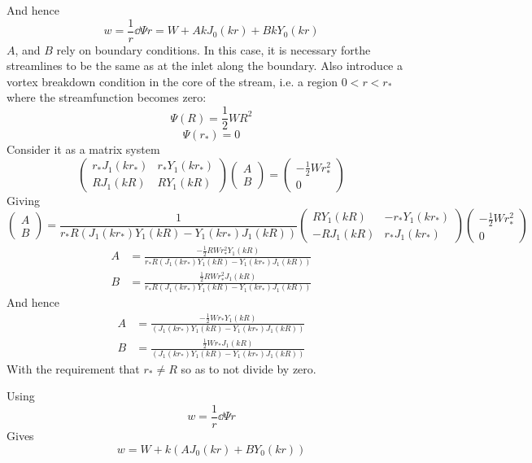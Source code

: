 \documentclass{X:/Documents/Coding/Latex/myreport}
\begin{document}
And hence
\[w = \frac1r \dd\Psi r = W + Ak J_0(kr) + Bk Y_0(kr)\]
$A$, and $B$ rely on boundary conditions. In this case, it is necessary forthe streamlines to be the same as at the inlet along the boundary. Also introduce a vortex breakdown condition in the core of the stream, i.e. a region $0<r<r_*$ where the streamfunction becomes zero:
\[\Psi(R) = \frac12 WR^2\]
\[\Psi(r_*) = 0 \]
Consider it as a matrix system
\[
\begin{pmatrix}
r_*J_1(kr_*) & r_*Y_1(kr_*)\\
RJ_1(kR) & RY_1(kR)
\end{pmatrix}\begin{pmatrix}
A\\B
\end{pmatrix} = 
\begin{pmatrix}
-\frac12 Wr_*^2\\0
\end{pmatrix}
\]
Giving
\[
\begin{pmatrix}
A\\B
\end{pmatrix} = 
\frac{1}{r_* R\left(J_1(kr_*)Y_1(kR) - Y_1(kr_*)J_1(kR)\right)}
\begin{pmatrix}
RY_1(kR) & -r_*Y_1(kr_*)\\
-RJ_1(kR) & r_*J_1(kr_*)
\end{pmatrix}
\begin{pmatrix}
-\frac12 Wr_*^2\\0
\end{pmatrix}
\]
\begin{align*}
    A&= \frac{-\frac12 RW r_*^2 Y_1(kR)}{r_*R\left(J_1(kr_*)Y_1(kR) - Y_1(kr_*)J_1(kR)\right)}\\
B&=\frac{\frac12 RW r_*^2 J_1(kR)}{r_*R\left(J_1(kr_*)Y_1(kR) - Y_1(kr_*)J_1(kR)\right)}
\end{align*}
And hence
\begin{align*}
    A&= \frac{-\frac12 W r_*Y_1(kR)}{\left(J_1(kr_*)Y_1(kR) - Y_1(kr_*)J_1(kR)\right)}\\
B&=\frac{\frac12 W r_* J_1(kR)}{\left(J_1(kr_*)Y_1(kR) - Y_1(kr_*)J_1(kR)\right)}
\end{align*}
With the requirement that $r_* \neq R$ so as to not divide by zero.


Using 
\[w = \frac1r \dd\Psi r\] 
Gives
\[w = W + k(AJ_0(kr) + BY_0(kr))\]
\end{document}
